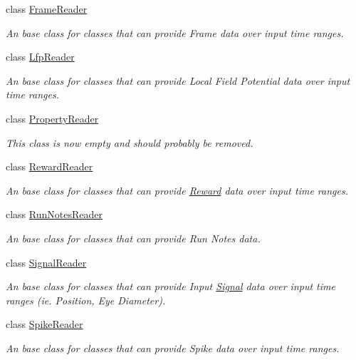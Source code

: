 \begin{DoxyCompactItemize}
class \hyperlink{class_picto_1_1_frame_reader}{Frame\-Reader}
\begin{DoxyCompactList}\small\item\em An base class for classes that can provide Frame data over input time ranges. \end{DoxyCompactList}\item 
class \hyperlink{class_picto_1_1_lfp_reader}{Lfp\-Reader}
\begin{DoxyCompactList}\small\item\em An base class for classes that can provide Local Field Potential data over input time ranges. \end{DoxyCompactList}\item 
class \hyperlink{class_picto_1_1_property_reader}{Property\-Reader}
\begin{DoxyCompactList}\small\item\em This class is now empty and should probably be removed. \end{DoxyCompactList}\item 
class \hyperlink{class_picto_1_1_reward_reader}{Reward\-Reader}
\begin{DoxyCompactList}\small\item\em An base class for classes that can provide \hyperlink{class_picto_1_1_reward}{Reward} data over input time ranges. \end{DoxyCompactList}\item 
class \hyperlink{class_picto_1_1_run_notes_reader}{Run\-Notes\-Reader}
\begin{DoxyCompactList}\small\item\em An base class for classes that can provide Run Notes data. \end{DoxyCompactList}\item 
class \hyperlink{class_picto_1_1_signal_reader}{Signal\-Reader}
\begin{DoxyCompactList}\small\item\em An base class for classes that can provide Input \hyperlink{class_picto_1_1_signal}{Signal} data over input time ranges (ie. Position, Eye Diameter). \end{DoxyCompactList}\item 
class \hyperlink{class_picto_1_1_spike_reader}{Spike\-Reader}
\begin{DoxyCompactList}\small\item\em An base class for classes that can provide Spike data over input time ranges. \end{DoxyCompactList}\item 

\end{DoxyCompactItemize}
